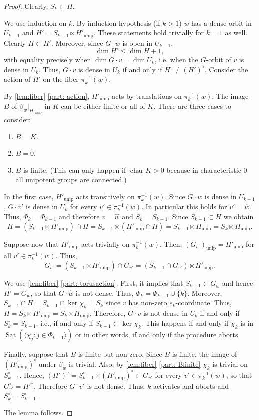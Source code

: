 \documentclass[12pt]{article}
\newcommand{\rest}{\big |}
\newcommand{\rad}[1]{#1_{\operatorname{unip}}}
\newcommand{\Sat}{\operatorname{Sat}}
\newcommand{\chr}{\operatorname{char}}
\begin{document}
\begin{proof}
Clearly, $S_k\subset H$.

We use induction on $k$. 
By induction hypothesis (if $k>1$) $w$ has a dense orbit in $U_{k-1}$ and $H'=S_{k-1}\ltimes \rad{H'}$.
These statements hold trivially for $k=1$ as well.
Clearly $H\subset H'$. Moreover, since $G\cdot w$ is open in $U_{k-1}$,
\[
\dim H'\le\dim H+1,
\]
with equality precisely when $\dim G\cdot v=\dim U_k$, i.e. when the $G$-orbit of $v$ is dense in $U_k$.
Thus, $G\cdot v$ is dense in $U_k$ if and only if $H^\circ\ne (H')^\circ$.
Consider the action of $H'$ on the fiber $\pi_k^{-1}(w)$. 

By \cref{lem:fiber} \cref{part: action}, $\rad{H'}$ acts by translations on $\pi_k^{-1}(w)$.
The image $B$ of $\beta_w\rest_{\rad{H'}}$ in $K$ can be either finite or all of $K$.
There are three cases to consider:
\begin{enumerate}
\item $B=K$.
\item $B=0$.
\item $B$ is finite. (This can only happen if $\chr K>0$ because in characteristic $0$ all unipotent groups are connected.)
\end{enumerate} 
In the first case, $\rad{H'}$ acts transitively on $\pi_k^{-1}(w)$.
Since $G\cdot w$ is dense in $U_{k-1}$, $G\cdot v'$ is dense in $U_k$ for every $v'\in\pi_k^{-1}(w)$.
In particular this holds for $v'=\hat w$. Thus, $\Phi_k=\Phi_{k-1}$ and therefore $v=\hat w$ and $S_k=S_{k-1}$.
Since $S_{k-1}\subset H$ we obtain
\[
H=(S_{k-1}\ltimes \rad{H'})\cap H=S_{k-1}\ltimes (\rad{H'}\cap H)=S_{k-1} \ltimes \rad{H}=S_k\ltimes \rad{H}.
\]


Suppose now that $\rad{H'}$ acts trivially on $\pi_k^{-1}(w)$.
Then, $\rad{(G_{v'})}=\rad{H'}$ for all $v'\in\pi_k^{-1}(w)$.
Thus,
\[
G_{v'}=(S_{k-1}\ltimes \rad{H'})\cap G_{v'}=(S_{k-1}\cap G_{v'})\ltimes  \rad{H'}.
\]

We use \cref{lem:fiber} \cref{part: torusaction}.
First, it implies that $S_{k-1}\subset G_{\hat w}$ and hence $H'=G_{\hat w}$, so that $G\cdot\hat w$ is not dense.
Thus, $\Phi_k=\Phi_{k-1}\cup\{k\}$. 
Moreover, $S_{k-1}\cap H=S_{k-1}\cap\ker\chi_k=S_k$ since $v$ has non-zero $e_k$-coordinate.
Thus, $H=S_k\ltimes \rad{H'}=S_k\ltimes \rad{H}$.
Therefore, $G\cdot v$ is not dense in $U_k$ if and only if $S_k^\circ=S_{k-1}^\circ$, i.e., if and only if $S_{k-1}^\circ\subset\ker\chi_k$.
This happens if and only if $\chi_k$ is in $\Sat(\langle\chi_j:j\in\Phi_{k-1}\rangle)$ or in other words, if and only if the procedure aborts.

Finally, suppose that $B$ is finite but non-zero.
Since $B$ is finite, the image of $(\rad{H'})^\circ$ under $\beta_w$ is trivial.
Also, by \cref{lem:fiber} \cref{part: Bfinite}
$\chi_k$ is trivial on $S_{k-1}^\circ$.
Hence, $(H')^\circ=S_{k-1}^\circ\ltimes (\rad{H'})^\circ\subset G_{v'}$
for every $v'\in\pi_k^{-1}(w)$, so that $G_{v'}^\circ=H'^{\circ}$. Therefore $G\cdot v'$ is not dense.
Thus, $k$ activates and aborts and $S_k^\circ=S_{k-1}^\circ$.

The lemma follows.
\end{proof}
\end{document}
